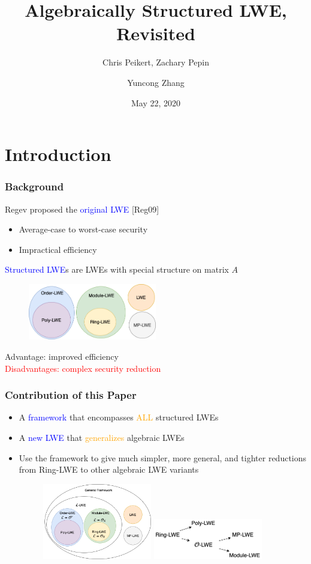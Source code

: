 \documentclass{beamer}
\title{Algebraically Structured LWE, Revisited}
\subtitle{Chris Peikert, Zachary Pepin}
\author{Yuncong Zhang}
\date{May 22, 2020}
\newcommand{\blue}[1]{\textcolor{blue}{#1}}
\newcommand{\dgreen}[1]{\textcolor{dgreen}{#1}}
\newcommand{\orange}[1]{\textcolor{orange}{#1}}
\newcommand{\red}[1]{\textcolor{red}{#1}}
\begin{document}
\frame{\titlepage}


\section{Introduction}
\frame
{
  \frametitle{Background}
  Regev proposed the \blue{original LWE} [Reg09]

  \begin{itemize}
  	\item Average-case to worst-case security
  	\item Impractical efficiency
  \end{itemize}

  \blue{Structured LWE}s are LWEs with special structure on matrix $A$
  \begin{figure}[ht!]
  \includegraphics[width=0.5\textwidth]{files/Structured-LWE.png}
  \end{figure}

  \dgreen{Advantage: improved efficiency}\\
  \red{Disadvantages: complex security reduction}

}

\frame
{
  \frametitle{Contribution of this Paper}
  \begin{itemize}
  	\item A \blue{framework} that encompasses \orange{ALL} structured LWEs

  	\item A \blue{new LWE} that \orange{generalizes} algebraic LWEs

  	\item Use the framework to give much \dgreen{simpler}, \dgreen{more general}, and \dgreen{tighter} reductions from Ring-LWE to other algebraic LWE variants

  	\begin{figure}[ht!]
  	\includegraphics[width=0.45\textwidth]{files/General-LWE.png}
  	\includegraphics[width=0.45\textwidth]{files/LWE-Reductions.png}
  	\end{figure}

  \end{itemize}
}
\end{document}
